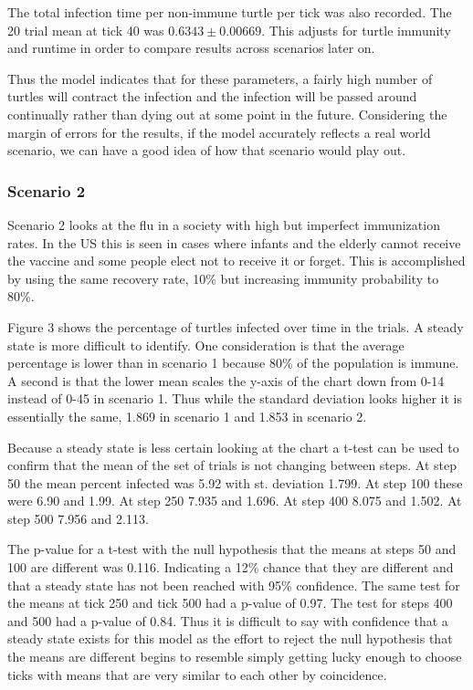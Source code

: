 \documentclass[11pt]{article} %
\begin{document}
The total infection time per non-immune turtle per tick was also recorded. The 20 trial mean at tick 40 was $0.6343 \pm 0.00669$. This adjusts for turtle immunity and runtime in order to compare results across scenarios later on. 


Thus the model indicates that for these parameters, a fairly high number of turtles will contract the infection and the infection will be passed around continually rather than dying out at some point in the future. Considering the margin of errors for the results, if the model accurately reflects a real world scenario, we can have a good idea of how that scenario would play out. 

\subsubsection{Scenario 2}

Scenario 2 looks at the flu in a society with high but imperfect immunization rates. In the US this is seen in cases where infants and the elderly cannot receive the vaccine and some people elect not to receive it or forget. This is accomplished by using the same recovery rate, 10\% but increasing immunity probability to 80\%. 



 Figure 3 shows the percentage of turtles infected over time in the trials. A steady state is more difficult to identify. One consideration is that the average percentage is lower than in scenario 1 because 80\% of the population is immune. A second is that the lower mean scales the y-axis of the chart down from 0-14 instead of 0-45 in scenario 1. Thus while the standard deviation looks higher it is essentially the same, 1.869 in scenario 1 and 1.853 in scenario 2. 

Because a steady state is less certain looking at the chart a t-test can be used to confirm that the mean of the set of trials is not changing between steps. At step 50 the mean percent infected was 5.92 with st. deviation 1.799. At step 100 these were 6.90 and 1.99. At step 250 7.935 and 1.696. At step 400 8.075 and 1.502. At step 500 7.956 and 2.113. 

The p-value for a t-test with the null hypothesis that the means at steps 50 and 100 are different was 0.116. Indicating a 12\% chance that they are different and that a steady state has not been reached with 95\% confidence. The same test for the means at tick 250 and tick 500 had a p-value of 0.97. The test for steps 400 and 500 had a p-value of 0.84. Thus it is difficult to say with confidence that a steady state exists for this model as the effort to reject the null hypothesis that the means are different begins to resemble simply getting lucky enough to choose ticks with means that are very similar to each other by coincidence. 
\end{document}
